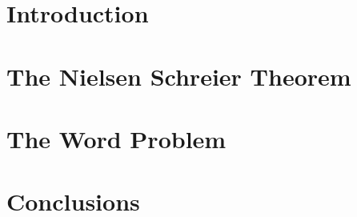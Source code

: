 \documentclass[12pt]{report}
\theoremstyle{definition}
\numberwithin{equation}{theorem}
\begin{document}


\tableofcontents

\chapter{Introduction}
\label{chap:intro}


\chapter{The Nielsen Schreier Theorem}
\label{chap:ns}


\chapter{The Word Problem}
\label{chap:wp}


\chapter{Conclusions}
\label{chap:conc}

\nocite{rotman1999introduction}
\nocite{bridges1994}
\nocite{de-mol2018}


\end{document}
